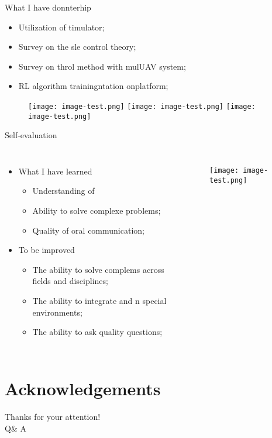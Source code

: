 \documentclass[table,aspectratio=1610]{beamer}%
\begin{document}
\begin{frame}{What I have donnterhip}
	\begin{itemize}
		\item Utilization of timulator;
		\item Survey on the sle control theory;
		\item Survey on throl method with mulUAV system;
		\item RL algorithm trainingntation onplatform;
	\end{itemize}

	\begin{figure}
		\centering
		\texttt{[image: image-test.png]} \hspace{2em}
		\texttt{[image: image-test.png]} \hspace{2em}
		\texttt{[image: image-test.png]}
	\end{figure}

\end{frame}


\begin{frame}{Self-evaluation}
	\begin{columns}
		\begin{itemize}
			\item What I have \alert{learned}
			\begin{itemize}
				\item Understanding of
				\item Ability to solve complexe problems;
				\item Quality of oral communication;
			\end{itemize}
		\vspace{2ex}
			\item To be \alert{improved}
			\begin{itemize}
				\item The ability to solve complems across fields and disciplines;
				\item The ability to integrate and n special environments;
				\item The ability to ask quality questions;
			\end{itemize}
		\end{itemize}
	
		\begin{figure}
			\centering
			\texttt{[image: image-test.png]}
		\end{figure}
	\end{columns}
\end{frame}

\section*{Acknowledgements}
\begin{frame}
	\centering
	\Huge
	Thanks for your attention!\\
	Q\& A
\end{frame}
\end{document}
